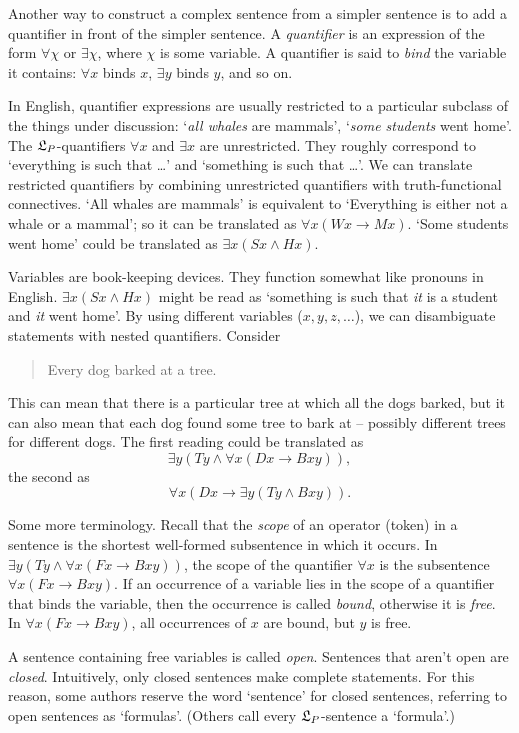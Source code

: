 Another way to construct a complex sentence from a simpler sentence is to add a
quantifier in front of the simpler sentence. A \emph{quantifier} is an
expression of the form $\forall \chi$ or $\exists \chi$, where $\chi$ is some
variable. A quantifier is said to \emph{bind} the variable it contains:
$\forall x$ binds $x$, $\exists y$ binds $y$, and so on.

In English, quantifier expressions are usually restricted to a particular
subclass of the things under discussion: `\emph{all whales} are mammals',
`\emph{some students} went home'. The $\mathfrak{L}_{P}$-quantifiers $\forall x$ and
$\exists x$ are unrestricted. They roughly correspond to `everything is such
that \ldots' and `something is such that \ldots'. We can translate restricted
quantifiers by combining unrestricted quantifiers with truth-functional
connectives. `All whales are mammals' is equivalent to `Everything is either not
a whale or a mammal'; so it can be translated as $\forall x(Wx \to Mx)$. `Some
students went home' could be translated as $\exists x (Sx \land Hx)$.

Variables are book-keeping devices. They function somewhat like pronouns in
English. $\exists x(Sx \land Hx)$ might be read as `something is such that
\emph{it} is a student and \emph{it} went home'. By using different variables
($x,y,z,\ldots$), we can disambiguate statements with nested quantifiers.
Consider
\begin{quote}
  Every dog barked at a tree.
\end{quote}
This can mean that there is a particular tree at which all the dogs barked, but
it can also mean that each dog found some tree to bark at -- possibly different
trees for different dogs. The first reading could be translated as
\[
  \exists y (Ty \land \forall x (Dx \to Bxy)),
\]
the second as
\[
  \forall x (Dx \to \exists y(Ty \land Bxy)).
\]

Some more terminology. Recall that the \emph{scope} of an operator (token) in a
sentence is the shortest well-formed subsentence in which it occurs. In
$\exists y (Ty \land \forall x(Fx \to Bxy))$, the scope of the quantifier
$\forall x$ is the subsentence $\forall x(Fx \to Bxy)$. If an occurrence of a
variable lies in the scope of a quantifier that binds the variable, then the
occurrence is called \emph{bound}, otherwise it is \emph{free}. In
$\forall x(Fx \to Bxy)$, all occurrences of $x$ are bound, but $y$ is free.

A sentence containing free variables is called \emph{open}. Sentences that aren't
open are \emph{closed}. Intuitively, only closed sentences make complete
statements. For this reason, some authors reserve the word `sentence' for closed
sentences, referring to open sentences as `formulas'. (Others call every
$\mathfrak{L}_P$-sentence a `formula'.)

